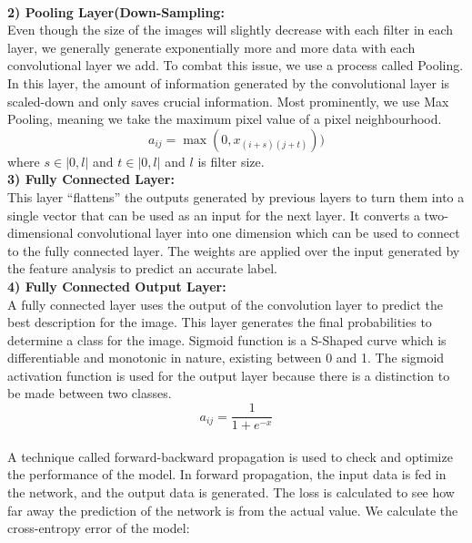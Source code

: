 \documentclass[12pt]{revtex4}
\begin{document}
\\\textbf{2) Pooling Layer(Down-Sampling:}
\\Even though the size of the images will slightly decrease with each filter in each layer, we generally generate exponentially more and more data with each convolutional layer we add. To combat this issue, we use a process called Pooling. In this layer, the amount of information generated by the convolutional layer is scaled-down and only saves crucial information. Most prominently, we use Max Pooling, meaning we take the maximum pixel value of a pixel neighbourhood.
\begin{equation}a_{i j}=\max \left(0, x_{(i+s)(j+t)}\right))\end{equation}
where $s \in|0, l|$ and $t \in|0, l|$ and $l$ is filter size.
\\\textbf{3) Fully Connected Layer:}
\\This layer “flattens” the outputs generated by previous layers to turn them into a single vector that can be used as an input for the next layer. It converts a two-dimensional convolutional layer into one dimension which can be used to connect to the fully connected layer.  The weights are applied over the input generated by the feature analysis to predict an accurate label.
\\\textbf{4) Fully Connected Output Layer:}
\\A fully connected layer uses the output of the convolution layer to predict the best description for the image. This layer generates the final probabilities to determine a class for the image. Sigmoid function is a S-Shaped curve which is differentiable and monotonic in nature, existing between 0 and 1. The sigmoid activation function is used for the output layer because there is a distinction to be made between two classes. 
\begin{equation}a_{i j}=\frac{1}{1+e^{-x}}\end{equation}
\\A technique called forward-backward propagation is used to check and optimize the performance of the model. In forward propagation, the input data is fed in the network, and the output data is generated. The loss is calculated to see how far away the prediction of the network is from the actual value. We calculate the cross-entropy error of the model: 
\end{document}
